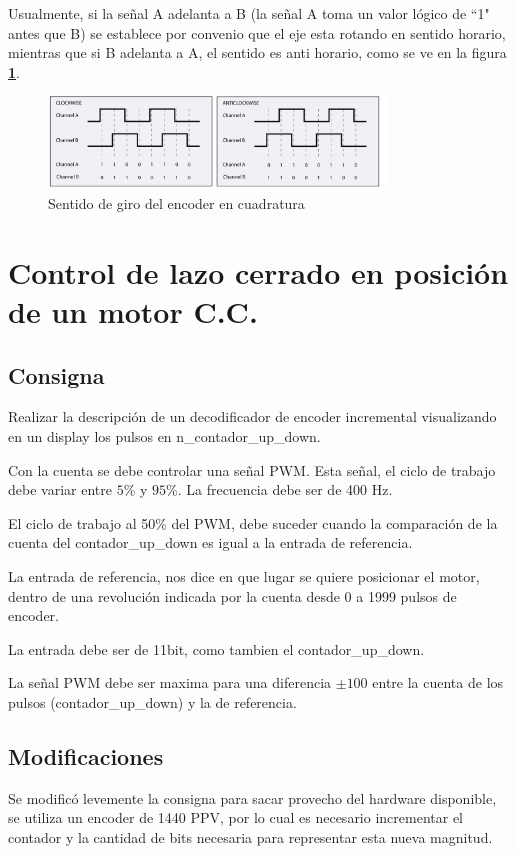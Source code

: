 \documentclass[11pt, a4paper]{article}
\begin{document}
Usualmente, si la señal A adelanta a B (la señal A toma un valor lógico de ``1" antes que B) se establece por convenio que el eje esta rotando en sentido horario, mientras que si B adelanta a A, el sentido es anti horario, como se ve en la figura \textcolor{blue}{\textbf{\ref{fig:encoder_cuadratura}}}.
\begin{figure}[h]
	\centering
	\includegraphics[width=0.8\textwidth]{Imagenes/encoder_cuadratura.jpg}
	\caption{Sentido de giro del encoder en cuadratura}
	\label{fig:encoder_cuadratura}
\end{figure} 

\clearpage
\section{Control de lazo cerrado en posición de un motor C.C.}
\subsection{Consigna}
	Realizar la descripción de un decodificador de encoder incremental visualizando en un display los pulsos en n\_contador\_up\_down.

	Con la cuenta se debe controlar una señal PWM. Esta señal, el ciclo de trabajo debe variar entre $5\%$ y $95\%$. La frecuencia debe ser de 400 Hz.

	El ciclo de trabajo al 50\% del PWM, debe suceder cuando la comparación de la cuenta del contador\_up\_down es igual a la entrada de referencia.

	La entrada de referencia, nos dice en que lugar se quiere posicionar el motor, dentro de una revolución indicada por la cuenta desde 0 a 1999 pulsos de encoder.

	La entrada debe ser de 11bit, como tambien el contador\_up\_down.

	La señal PWM debe ser maxima para una diferencia $\pm 100$ entre la cuenta de los pulsos (contador\_up\_down) y la de referencia.


\subsection{Modificaciones}
	Se modificó levemente la consigna para sacar provecho del hardware disponible, se utiliza un encoder de 1440 PPV, por lo cual es necesario incrementar el contador y la cantidad de bits necesaria para representar esta nueva magnitud.
\end{document}
